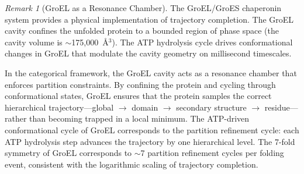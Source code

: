 \documentclass[11pt,twocolumn,a4paper]{article}
\theoremstyle{definition}
\theoremstyle{remark}
\newtheorem{remark}[theorem]{Remark}
\begin{document}
\begin{remark}[GroEL as a Resonance Chamber]
The GroEL/GroES chaperonin system \citep{hartl2002} provides a physical implementation of trajectory completion. The GroEL cavity confines the unfolded protein to a bounded region of phase space (the cavity volume is $\sim$175{,}000~\AA$^3$). The ATP hydrolysis cycle drives conformational changes in GroEL that modulate the cavity geometry on millisecond timescales.

In the categorical framework, the GroEL cavity acts as a resonance chamber that enforces partition constraints. By confining the protein and cycling through conformational states, GroEL ensures that the protein samples the correct hierarchical trajectory---global $\to$ domain $\to$ secondary structure $\to$ residue---rather than becoming trapped in a local minimum. The ATP-driven conformational cycle of GroEL corresponds to the partition refinement cycle: each ATP hydrolysis step advances the trajectory by one hierarchical level. The 7-fold symmetry of GroEL corresponds to $\sim$7 partition refinement cycles per folding event, consistent with the logarithmic scaling of trajectory completion.
\end{remark}
\end{document}
